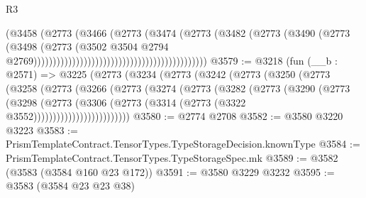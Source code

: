 \begin{lexlean}{R3}
\begin{coremodule}
                                                                    (@3458
                                                                      (@2773
                                                                        (@3466
                                                                          (@2773
                                                                            (@3474
                                                                              (@2773
                                                                                (@3482
                                                                                  (@2773
                                                                                    (@3490
                                                                                      (@2773
                                                                                        (@3498
                                                                                          (@2773
                                                                                            (@3502
                                                                                              @3504
                                                                                              @2794
                                                                                              @2769)))))))))))))))))))))))))))))))))))))))))))))
@3579 := @3218
    (fun (__b : @2571) =>
    @3225
      (@2773
        (@3234
          (@2773
            (@3242
              (@2773
                (@3250
                  (@2773
                    (@3258
                      (@2773
                        (@3266
                          (@2773
                            (@3274
                              (@2773
                                (@3282
                                  (@2773
                                    (@3290
                                      (@2773
                                        (@3298
                                          (@2773
                                            (@3306
                                              (@2773
                                                (@3314 (@2773 (@3322 @3552)))))))))))))))))))))))))
@3580 := @2774 @2708
@3582 := @3580 @3220 @3223
@3583 := PrismTemplateContract.TensorTypes.TypeStorageDecision.knownType
@3584 := PrismTemplateContract.TensorTypes.TypeStorageSpec.mk
@3589 := @3582 (@3583 (@3584 @160 @23 @172))
@3591 := @3580 @3229 @3232
@3595 := @3583 (@3584 @23 @23 @38)

\end{coremodule}
\end{lexlean}
